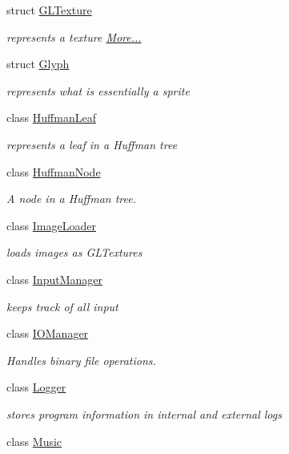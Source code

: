 \begin{DoxyCompactItemize}
struct \hyperlink{namespacenta_d3/dff/structnta_1_1GLTexture}{G\+L\+Texture}
\begin{DoxyCompactList}\small\item\em represents a texture  \hyperlink{namespacenta_d3/dff/structnta_1_1GLTexture}{More...}\end{DoxyCompactList}\item 
struct \hyperlink{structnta_1_1Glyph}{Glyph}
\begin{DoxyCompactList}\small\item\em represents what is essentially a sprite \end{DoxyCompactList}\item 
class \hyperlink{classnta_1_1HuffmanLeaf}{Huffman\+Leaf}
\begin{DoxyCompactList}\small\item\em represents a leaf in a Huffman tree \end{DoxyCompactList}\item 
class \hyperlink{classnta_1_1HuffmanNode}{Huffman\+Node}
\begin{DoxyCompactList}\small\item\em A node in a Huffman tree. \end{DoxyCompactList}\item 
class \hyperlink{classnta_1_1ImageLoader}{Image\+Loader}
\begin{DoxyCompactList}\small\item\em loads images as G\+L\+Textures \end{DoxyCompactList}\item 
class \hyperlink{classnta_1_1InputManager}{Input\+Manager}
\begin{DoxyCompactList}\small\item\em keeps track of all input \end{DoxyCompactList}\item 
class \hyperlink{classnta_1_1IOManager}{I\+O\+Manager}
\begin{DoxyCompactList}\small\item\em Handles binary file operations. \end{DoxyCompactList}\item 
class \hyperlink{classnta_1_1Logger}{Logger}
\begin{DoxyCompactList}\small\item\em stores program information in internal and external logs \end{DoxyCompactList}\item 
class \hyperlink{classnta_1_1Music}{Music}

\end{DoxyCompactItemize}
